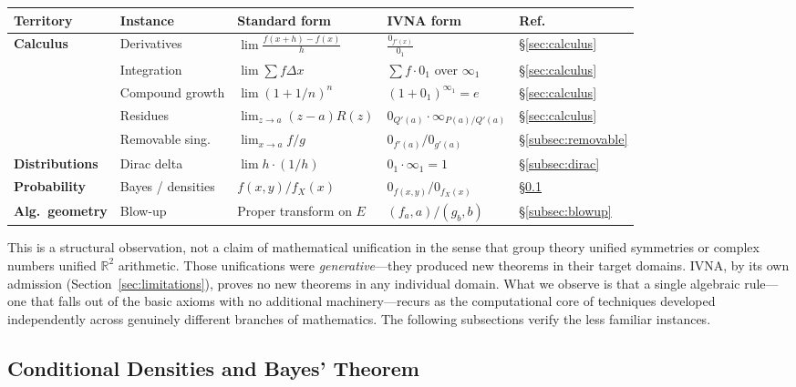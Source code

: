 \documentclass[12pt]{article}
\theoremstyle{definition}
\theoremstyle{remark}
\newcommand{\vz}[1]{0_{#1}}             %
\newcommand{\vi}[1]{\infty_{#1}}        %
\newcommand{\R}{\mathbb{R}}
\begin{document}
\begin{center}
\small
\begin{tabular}{lllll}
\toprule
\textbf{Territory} & \textbf{Instance} & \textbf{Standard form} & \textbf{IVNA form} & \textbf{Ref.} \\
\midrule
\textbf{Calculus}
  & Derivatives       & $\lim \frac{f(x+h)-f(x)}{h}$ & $\frac{\vz{f'(x)}}{\vz{1}}$  & \S\ref{sec:calculus} \\
  & Integration       & $\lim \sum f \Delta x$ & $\sum f \cdot \vz{1}$ over $\vi{1}$ & \S\ref{sec:calculus} \\
  & Compound growth   & $\lim (1+1/n)^n$   & $(1+\vz{1})^{\vi{1}} = e$  & \S\ref{sec:calculus} \\
  & Residues          & $\lim_{z\to a}(z\!-\!a)R(z)$  & $\vz{Q'(a)} \cdot \vi{P(a)/Q'(a)}$  & \S\ref{sec:calculus} \\
  & Removable sing.   & $\lim_{x\to a} f/g$   & $\vz{f'(a)}/\vz{g'(a)}$  & \S\ref{subsec:removable} \\
\midrule
\textbf{Distributions}
  & Dirac delta       & $\lim h \cdot (1/h)$   & $\vz{1} \cdot \vi{1} = 1$  & \S\ref{subsec:dirac} \\
\midrule
\textbf{Probability}
  & Bayes / densities & $f(x,y)/f_X(x)$ & $\vz{f(x,y)}/\vz{f_X(x)}$   & \S\ref{subsec:bayes} \\
\midrule
\textbf{Alg.\ geometry}
  & Blow-up           & Proper transform on $E$ & $(f_a, a)/(g_b, b)$  & \S\ref{subsec:blowup} \\
\bottomrule
\end{tabular}
\end{center}

This is a structural observation, not a claim of mathematical
unification in the sense that group theory unified symmetries or
complex numbers unified $\R^2$ arithmetic. Those unifications were
\emph{generative}---they produced new theorems in their target
domains. IVNA, by its own admission
(Section~\ref{sec:limitations}), proves no new theorems in any
individual domain. What we observe is that a single algebraic
rule---one that falls out of the basic axioms with no additional
machinery---recurs as the computational core of techniques
developed independently across genuinely different branches of
mathematics. The following subsections verify the less familiar
instances.

\subsection{Conditional Densities and Bayes' Theorem}
\label{subsec:bayes}
\end{document}
